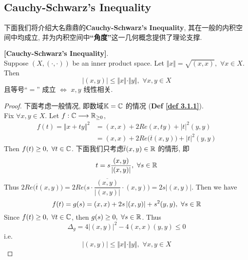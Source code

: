 \newpage

\subsection{Cauchy-Schwarz's Inequality}
	下面我们将介绍大名鼎鼎的\textbf{Cauchy-Schwarz's Inequality}, 其在一般的内积空间中均成立, 并为内积空间中\textbf{“角度”}这一几何概念提供了理论支撑. 
	
	\vspace{1em}
	
	\begin{thm}\label{thm 3.1.1}
		\textbf{[Cauchy-Schwarz's Inequality]}. \\
		Suppose $(X , (\cdot , \cdot))$ be an inner product space. Let $\Vert x \Vert = \sqrt{(x , x)} , \,\, \forall x \in X$. Then 
		\[ \Big| (x , y) \Big| \leq \Vert x \Vert \cdot \Vert y \Vert , \,\, \forall x , y \in X \]
		且等号“$=$” 成立$\,\, \Leftrightarrow \,\, x , y$ 线性相关. 
		
		\vspace{6em}
		
		\begin{proof}
			下面考虑一般情况, 即数域$\mathbb{K} = \mathbb{C}$ 的情况 (\textbf{Def \ref{def 3.1.1}}). \\
			Fix $\forall x,  y \in X$. Let $f : \mathbb{C} \longrightarrow \mathbb{R}_{\geq 0}$, 
			\begin{align} 
			f(t) 
			= \Vert x + ty \Vert^2 
			&= (x , x) + 2 Re(x , ty) + \left| t \right|^2 (y , y) \\
			&= (x , x) + 2 Re \Big( \overline{t} (x , y) \Big) + \left| t \right|^2 (y , y)
			\end{align}
			Then $f(t) \geq 0 , \,\, \forall t \in \mathbb{C}$. 下面我们只考虑$\overline{t} (x , y) \in \mathbb{R}$ 的情形, 即
			\[ t = s \frac{(x , y)}{\left| (x , y) \right|} , \,\, \forall s \in \mathbb{R} \]
			Thus $2Re \Big( \overline{t} (x , y) \Big) = 2 Re \Big( s \cdot \dfrac{\overline{(x , y)}}{\left| (x , y) \right|} \cdot (x , y) \Big) = 2s \left| (x , y) \right|$. Then we have
			\[
				f(t) = g(s) = (x , x) + 2s \left| (x , y) \right| + s^2 (y , y) , \,\, \forall s \in \mathbb{R}
			\]
			Since $f(t) \geq 0 , \,\, \forall t \in \mathbb{C}$, then $g(s) \geq 0 , \,\, \forall s \in \mathbb{R}$. Thus
			\[ \Delta_g = 4\Big| (x , y) \Big|^2 - 4 (x , x) (y , y) \leq 0 \]
			i.e. 
			\[ \Big| (x , y) \Big| \leq \Vert x \Vert \cdot \Vert y \Vert , \,\, \forall x , y \in X \]
		\end{proof}
	\end{thm}

\newpage

